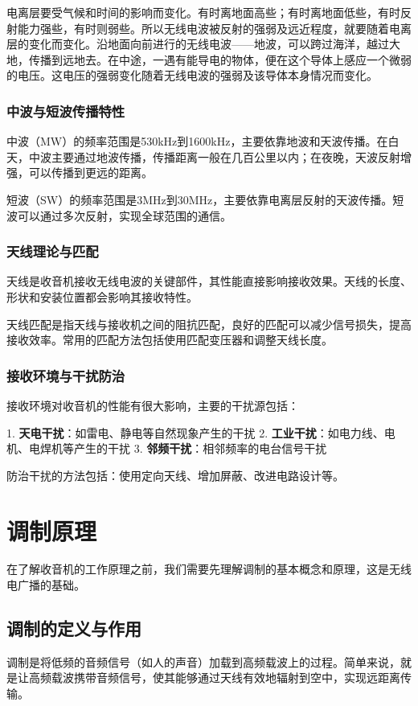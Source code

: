\documentclass[12pt,UTF8]{ctexbook}
\begin{document}
电离层要受气候和时间的影响而变化。有时离地面高些；有时离地面低些，有时反射能力强些，有时则弱些。所以无线电波被反射的强弱及远近程度，就要随着电离层的变化而变化。沿地面向前进行的无线电波——地波，可以跨过海洋，越过大地，传播到远地去。在中途，一遇有能导电的物体，便在这个导体上感应一个微弱的电压。这电压的强弱变化随着无线电波的强弱及该导体本身情况而变化。

\subsubsection{中波与短波传播特性}

中波（MW）的频率范围是530kHz到1600kHz，主要依靠地波和天波传播。在白天，中波主要通过地波传播，传播距离一般在几百公里以内；在夜晚，天波反射增强，可以传播到更远的距离。

短波（SW）的频率范围是3MHz到30MHz，主要依靠电离层反射的天波传播。短波可以通过多次反射，实现全球范围的通信。

\subsubsection{天线理论与匹配}

天线是收音机接收无线电波的关键部件，其性能直接影响接收效果。天线的长度、形状和安装位置都会影响其接收特性。

天线匹配是指天线与接收机之间的阻抗匹配，良好的匹配可以减少信号损失，提高接收效率。常用的匹配方法包括使用匹配变压器和调整天线长度。

\subsubsection{接收环境与干扰防治}

接收环境对收音机的性能有很大影响，主要的干扰源包括：

1. \textbf{天电干扰}：如雷电、静电等自然现象产生的干扰
2. \textbf{工业干扰}：如电力线、电机、电焊机等产生的干扰
3. \textbf{邻频干扰}：相邻频率的电台信号干扰

防治干扰的方法包括：使用定向天线、增加屏蔽、改进电路设计等。

\section{调制原理}

在了解收音机的工作原理之前，我们需要先理解调制的基本概念和原理，这是无线电广播的基础。

\subsection{调制的定义与作用}
调制是将低频的音频信号（如人的声音）加载到高频载波上的过程。简单来说，就是让高频载波携带音频信号，使其能够通过天线有效地辐射到空中，实现远距离传输。
\end{document}
